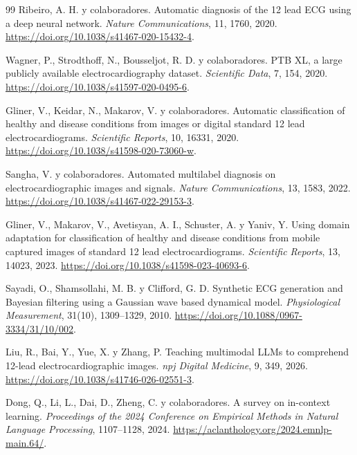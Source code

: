 \begin{thebibliography}{99}
Ribeiro, A. H. y colaboradores.
\newblock Automatic diagnosis of the 12 lead ECG using a deep neural network.
\newblock \emph{Nature Communications}, 11, 1760, 2020.
\newblock \url{https://doi.org/10.1038/s41467-020-15432-4}.

Wagner, P., Strodthoff, N., Bousseljot, R. D. y colaboradores.
\newblock PTB XL, a large publicly available electrocardiography dataset.
\newblock \emph{Scientific Data}, 7, 154, 2020.
\newblock \url{https://doi.org/10.1038/s41597-020-0495-6}.

Gliner, V., Keidar, N., Makarov, V. y colaboradores.
\newblock Automatic classification of healthy and disease conditions from images or digital standard 12 lead electrocardiograms.
\newblock \emph{Scientific Reports}, 10, 16331, 2020.
\newblock \url{https://doi.org/10.1038/s41598-020-73060-w}.

Sangha, V. y colaboradores.
\newblock Automated multilabel diagnosis on electrocardiographic images and signals.
\newblock \emph{Nature Communications}, 13, 1583, 2022.
\newblock \url{https://doi.org/10.1038/s41467-022-29153-3}.

Gliner, V., Makarov, V., Avetisyan, A. I., Schuster, A. y Yaniv, Y.
\newblock Using domain adaptation for classification of healthy and disease conditions from mobile captured images of standard 12 lead electrocardiograms.
\newblock \emph{Scientific Reports}, 13, 14023, 2023.
\newblock \url{https://doi.org/10.1038/s41598-023-40693-6}.

Sayadi, O., Shamsollahi, M. B. y Clifford, G. D.
\newblock Synthetic ECG generation and Bayesian filtering using a Gaussian wave based dynamical model.
\newblock \emph{Physiological Measurement}, 31(10), 1309--1329, 2010.
\newblock \url{https://doi.org/10.1088/0967-3334/31/10/002}.

Liu, R., Bai, Y., Yue, X. y Zhang, P.
\newblock Teaching multimodal LLMs to comprehend 12-lead electrocardiographic images.
\newblock \emph{npj Digital Medicine}, 9, 349, 2026.
\newblock \url{https://doi.org/10.1038/s41746-026-02551-3}.

Dong, Q., Li, L., Dai, D., Zheng, C. y colaboradores.
\newblock A survey on in-context learning.
\newblock \emph{Proceedings of the 2024 Conference on Empirical Methods in Natural Language Processing}, 1107--1128, 2024.
\newblock \url{https://aclanthology.org/2024.emnlp-main.64/}.


\end{thebibliography}
